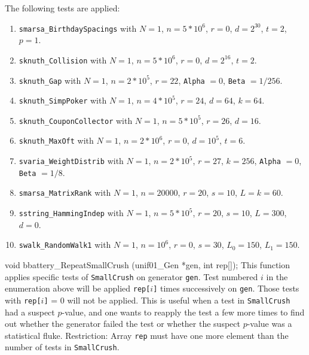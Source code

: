   The following tests are applied:
  \endtab
  \begin{enumerate}
  \item {\tt smarsa\_BirthdaySpacings} with $N=1$,  $n=5*10^6$,  $r=0$,
   $d = 2^{30}$, $t=2$, $p=1$.

  \item {\tt sknuth\_Collision} with $N=1$,  $n=5*10^6$,  $r=0$,
   $d = 2^{16}$, $t=2$.

  \item {\tt sknuth\_Gap}  with $N=1$,  $n=2*10^5$,  $r=22$, {\tt Alpha} $=0$,
    {\tt Beta} $=1/256$.

  \item {\tt sknuth\_SimpPoker}  with $N=1$,  $n=4*10^5$,  $r=24$,
   $d = 64$, $k=64$.

  \item {\tt sknuth\_CouponCollector}  with $N=1$, $n=5*10^5$, $r=26$,
   $d=16$.

  \item {\tt  sknuth\_MaxOft}  with $N=1$,  $n=2*10^6$,  $r=0$,
   $d = 10^5$, $t=6$.

  \item {\tt  svaria\_WeightDistrib} with $N=1$, $n=2*10^5$, $r=27$,
   $k=256$, {\tt Alpha} $=0$,  {\tt Beta} $=1/8$.

  \item {\tt smarsa\_MatrixRank} with $N=1$,  $n=20000$,  $r=20$, $s=10$,
   $L = k=60$.

  \item {\tt sstring\_HammingIndep} with $N=1$, $n=5*10^5$,  $r=20$, $s=10$,
   $L = 300$, $d = 0$.

  \item {\tt swalk\_RandomWalk1} with $N=1$, $n=10^6$,  $r=0$, $s=30$,
   $L_0 = 150$, $L_1=150$.

  \end{enumerate}

\code


void bbattery_RepeatSmallCrush (unif01_Gen *gen, int rep[]);
\endcode
  \tab This function applies specific tests of {\tt SmallCrush} on
   generator {\tt gen}. Test numbered $i$ in the enumeration above will
  be applied {\tt rep[$i$]} times successively on  {\tt gen}. Those tests with
   {\tt rep[$i$]} = 0 will not be applied. This is useful when a test in
    {\tt SmallCrush} had a suspect $p$-value, and one wants to reapply the
  test a few more times to find out whether the generator failed
  the test or whether the suspect $p$-value was a statistical fluke.
  Restriction: Array {\tt rep} must have one more element than the
  number of tests in {\tt SmallCrush}.
 \endtab
\bigskip

